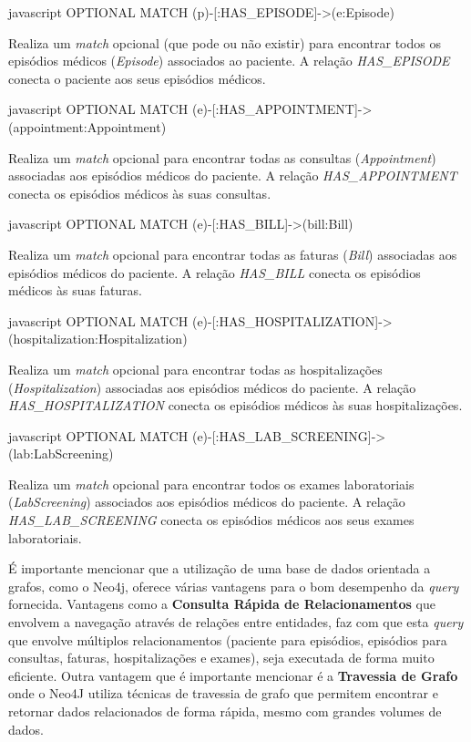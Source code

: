 \begin{myminted}{javascript}
OPTIONAL MATCH (p)-[:HAS_EPISODE]->(e:Episode)
\end{myminted}

Realiza um \textit{match} opcional (que pode ou não existir) para encontrar todos os episódios médicos (\textit{Episode}) associados ao paciente. A relação \textit{HAS\_EPISODE} conecta o paciente aos seus episódios médicos.

\begin{myminted}{javascript}
OPTIONAL MATCH (e)-[:HAS_APPOINTMENT]->(appointment:Appointment)
\end{myminted}

Realiza um \textit{match} opcional para encontrar todas as consultas (\textit{Appointment}) associadas aos episódios médicos do paciente. A relação \textit{HAS\_APPOINTMENT} conecta os episódios médicos às suas consultas.

\begin{myminted}{javascript}
OPTIONAL MATCH (e)-[:HAS_BILL]->(bill:Bill)
\end{myminted}

Realiza um \textit{match} opcional para encontrar todas as faturas (\textit{Bill}) associadas aos episódios médicos do paciente. A relação \textit{HAS\_BILL} conecta os episódios médicos às suas faturas.

\begin{myminted}{javascript}
OPTIONAL MATCH (e)-[:HAS_HOSPITALIZATION]->(hospitalization:Hospitalization)
\end{myminted}

Realiza um \textit{match} opcional para encontrar todas as hospitalizações (\textit{Hospitalization}) associadas aos episódios médicos do paciente. A relação \textit{HAS\_HOSPITALIZATION} conecta os episódios médicos às suas hospitalizações.

\begin{myminted}{javascript}
OPTIONAL MATCH (e)-[:HAS_LAB_SCREENING]->(lab:LabScreening)
\end{myminted}

Realiza um \textit{match} opcional para encontrar todos os exames laboratoriais (\textit{LabScreening}) associados aos episódios médicos do paciente. A relação \textit{HAS\_LAB\_SCREENING} conecta os episódios médicos aos seus exames laboratoriais.

É importante mencionar que a utilização de uma base de dados orientada a grafos, como o Neo4j, oferece várias vantagens para o bom desempenho da \textit{query} fornecida. Vantagens como a \textbf{Consulta Rápida de Relacionamentos} que envolvem a navegação através de relações entre entidades, faz com que esta \textit{query} que envolve múltiplos relacionamentos (paciente para episódios, episódios para consultas, faturas, hospitalizações e exames), seja executada de forma muito eficiente. Outra vantagem que é importante mencionar é a \textbf{Travessia de Grafo} onde o Neo4J utiliza técnicas de travessia de grafo que permitem encontrar e retornar dados relacionados de forma rápida, mesmo com grandes volumes de dados.

